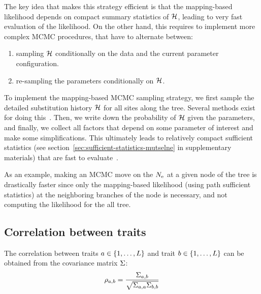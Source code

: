The key idea that makes this strategy efficient is that the mapping-based \gls{likelihood} depends on compact summary statistics of $\mathcal{H}$, leading to very fast evaluation of the \gls{likelihood}.
On the other hand, this requires to implement more complex \acrshort{MCMC} procedures, that have to alternate between:
\begin{enumerate}
    \item sampling $\mathcal{H}$ conditionally on the data and the current parameter configuration.
    \item re-sampling the parameters conditionally on $\mathcal{H}$.
\end{enumerate}

To implement the mapping-based \acrshort{MCMC} sampling strategy, we first sample the detailed \gls{substitution} history $\mathcal{H}$ for all sites along the tree.
Several methods exist for doing this~\citep{Nielsen2002,Rodrigue2008}.
Then, we write down the probability of $\mathcal{H}$ given the parameters, and finally, we collect all factors that depend on some parameter of interest and make some simplifications.
This ultimately leads to relatively compact sufficient statistics (see section~\ref{sec:sufficient-statistics-mutselne} in supplementary materials) that are fast to evaluate~\citep{Irvahn2014,Davydov2016}.

As an example, making an \acrshort{MCMC} move on the $N_{\mathrm{e}}$ at a given node of the tree is drastically faster since only the mapping-based \gls{likelihood} (using path sufficient statistics) at the neighboring branches of the node is necessary, and not computing the \gls{likelihood} for the all tree.

\subsection{Correlation between traits}
\label{sec:Correlation}
The correlation between traits $a \in \{1, \hdots, L\}$ and trait $b \in \{1, \hdots, L\}$ can be obtained from the covariance matrix $\Sigma$:
\begin{equation}
    \rho_{a, b} = \dfrac{\Sigma_{a, b}}{\sqrt{\Sigma_{a, a} \Sigma_{b, b}}}
\end{equation}

